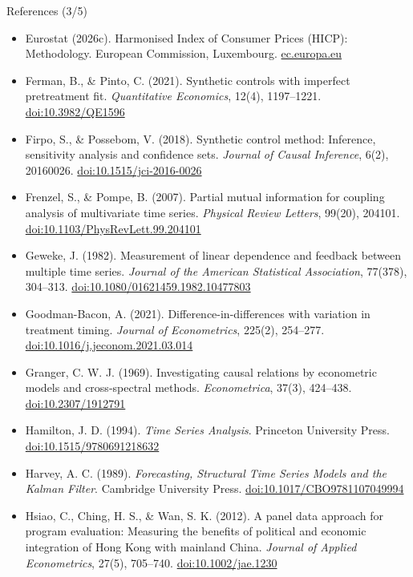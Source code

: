 \begin{frame}{References (3/5)}
\itemsize{\tiny}
\begin{itemize}
    \item Eurostat (2026c). Harmonised Index of Consumer Prices (HICP): Methodology. European Commission, Luxembourg. \href{https://ec.europa.eu/eurostat/web/hicp/methodology}{ec.europa.eu}
    \item Ferman, B., \& Pinto, C. (2021). Synthetic controls with imperfect pretreatment fit. \textit{Quantitative Economics}, 12(4), 1197--1221. \href{https://doi.org/10.3982/QE1596}{doi:10.3982/QE1596}
    \item Firpo, S., \& Possebom, V. (2018). Synthetic control method: Inference, sensitivity analysis and confidence sets. \textit{Journal of Causal Inference}, 6(2), 20160026. \href{https://doi.org/10.1515/jci-2016-0026}{doi:10.1515/jci-2016-0026}
    \item Frenzel, S., \& Pompe, B. (2007). Partial mutual information for coupling analysis of multivariate time series. \textit{Physical Review Letters}, 99(20), 204101. \href{https://doi.org/10.1103/PhysRevLett.99.204101}{doi:10.1103/PhysRevLett.99.204101}
    \item Geweke, J. (1982). Measurement of linear dependence and feedback between multiple time series. \textit{Journal of the American Statistical Association}, 77(378), 304--313. \href{https://doi.org/10.1080/01621459.1982.10477803}{doi:10.1080/01621459.1982.10477803}
    \item Goodman-Bacon, A. (2021). Difference-in-differences with variation in treatment timing. \textit{Journal of Econometrics}, 225(2), 254--277. \href{https://doi.org/10.1016/j.jeconom.2021.03.014}{doi:10.1016/j.jeconom.2021.03.014}
    \item Granger, C. W. J. (1969). Investigating causal relations by econometric models and cross-spectral methods. \textit{Econometrica}, 37(3), 424--438. \href{https://doi.org/10.2307/1912791}{doi:10.2307/1912791}
    \item Hamilton, J. D. (1994). \textit{Time Series Analysis}. Princeton University Press. \href{https://doi.org/10.1515/9780691218632}{doi:10.1515/9780691218632}
    \item Harvey, A. C. (1989). \textit{Forecasting, Structural Time Series Models and the Kalman Filter}. Cambridge University Press. \href{https://doi.org/10.1017/CBO9781107049994}{doi:10.1017/CBO9781107049994}
    \item Hsiao, C., Ching, H. S., \& Wan, S. K. (2012). A panel data approach for program evaluation: Measuring the benefits of political and economic integration of Hong Kong with mainland China. \textit{Journal of Applied Econometrics}, 27(5), 705--740. \href{https://doi.org/10.1002/jae.1230}{doi:10.1002/jae.1230}

\end{itemize}
\end{frame}
